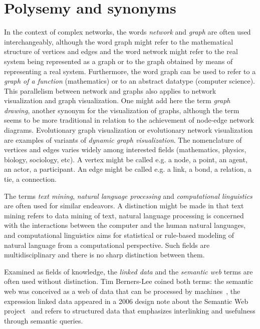 \section{Polysemy and synonyms}\label{amb}
In the context of complex networks, the words \emph{network} and \emph{graph}
are often used interchangeably, although the word graph might refer to the
mathematical structure of vertices and edges and the word network might refer to the
real system being represented as a graph or to the graph obtained by means of representing a real system.
Furthermore, the word graph can be used to refer to a \emph{graph of a function} (mathematics) or to an abstract datatype (computer science).
This parallelism between network and graphs also applies to network visualization and graph visualization.
One might add here the term \emph{graph drawing}, another synonym for the visualization of graphs, although the term
seems to be more traditional in relation to the achievement of node-edge network diagrams.
Evolutionary graph visualization or evolutionary network visualization are examples of variants of \emph{dynamic graph visualization}.
The nomenclature of vertices and edges varies widely among interested fields (mathematics, physics, biology, sociology, etc).
A vertex might be called e.g. a node, a point, an agent, an actor, a participant.
An edge might be called e.g. a link, a bond, a relation, a tie, a connection.


The terms \emph{text mining}, \emph{natural language processing} and \emph{computational linguistics}
are often used for similar endeavors.
A distinction might be made in that text mining refers to data mining of text,
natural language processing is concerned with the interactions between the computer and the human natural languages,
and computational linguistics aims for statistical or rule-based modeling of natural language from a computational perspective.
Such fields are multidisciplinary and there is no sharp distinction between them.

Examined as fields of knowledge, the \emph{linked data} and the \emph{semantic web}
terms are often used without distinction.
Tim Berners-Lee coined both terms: 
the semantic web was conceived as a web of data that can be processed by machines~\cite{lee0},
the expression linked data appeared in a 2006 design note about the Semantic Web project~\cite{lee1}
and refers to structured data that emphasizes interlinking and usefulness through semantic queries.

